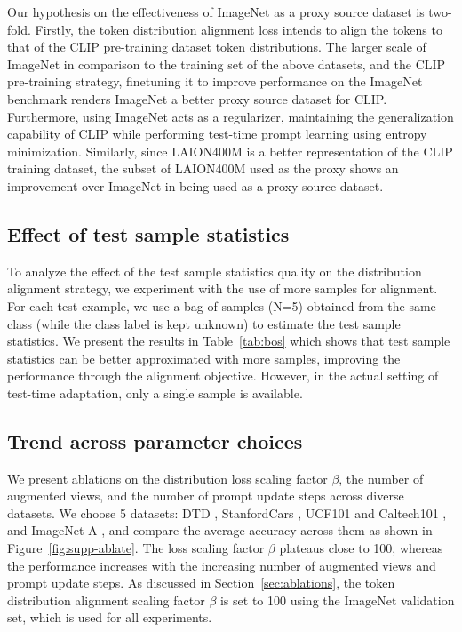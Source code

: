 Our hypothesis on the effectiveness of ImageNet as a proxy source dataset is two-fold. Firstly, the token distribution alignment loss intends to align the tokens to that of the CLIP pre-training dataset token distributions. The larger scale of ImageNet in comparison to the training set of the above datasets, and the CLIP pre-training strategy, finetuning it to improve performance on the ImageNet benchmark \cite{bahng2022exploring} renders ImageNet a better proxy source dataset for CLIP. Furthermore, using ImageNet acts as a regularizer, maintaining the generalization capability of CLIP while performing test-time prompt learning using entropy minimization. Similarly, since LAION400M is a better representation of the CLIP training dataset, the subset of LAION400M used as the proxy shows an improvement over ImageNet in being used as a proxy source dataset.





 

\subsection{Effect of test sample statistics}
To analyze the effect of the test sample statistics quality on the distribution alignment strategy, we experiment with the use of more samples for alignment. For each test example, we use a bag of samples (N=5) obtained from the same class (while the class label is kept unknown) to estimate the test sample statistics. We present the results in Table~\ref{tab:bos} which shows that test sample statistics can be better approximated with more samples, improving the performance through the alignment objective. However, in the actual setting of test-time adaptation, only a single sample is available.

\subsection{Trend across parameter choices}

We present ablations on the distribution loss scaling factor $\beta$, the number of augmented views, and the number of prompt update steps across diverse datasets. We choose 5 datasets: DTD , StanfordCars , UCF101  and Caltech101 , and ImageNet-A , and compare the average accuracy across them as shown in Figure~\ref{fig:supp-ablate}. The loss scaling factor $\beta$ plateaus close to 100, whereas the performance increases with the increasing number of augmented views and prompt update steps. As discussed in Section~\ref{sec:ablations}, the token distribution alignment scaling factor $\beta$ is set to 100 using the ImageNet validation set, which is used for all experiments.

